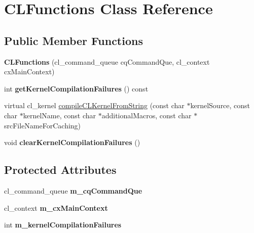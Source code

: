\hypertarget{class_c_l_functions}{\section{C\+L\+Functions Class Reference}
\label{class_c_l_functions}
}
\subsection*{Public Member Functions}
\begin{DoxyCompactItemize}
\item 
\hypertarget{class_c_l_functions_a1aba8fcfae73b1cf3992be273c649cb1}{{\bfseries C\+L\+Functions} (cl\+\_\+command\+\_\+queue cq\+Command\+Que, cl\+\_\+context cx\+Main\+Context)}\label{class_c_l_functions_a1aba8fcfae73b1cf3992be273c649cb1}

\item 
\hypertarget{class_c_l_functions_a0e188a86eb1fc902635a12a9364c4e18}{int {\bfseries get\+Kernel\+Compilation\+Failures} () const }\label{class_c_l_functions_a0e188a86eb1fc902635a12a9364c4e18}

\item 
virtual cl\+\_\+kernel \hyperlink{class_c_l_functions_a87f7cc3be08f51966e0bc087e7520a9f}{compile\+C\+L\+Kernel\+From\+String} (const char $\ast$kernel\+Source, const char $\ast$kernel\+Name, const char $\ast$additional\+Macros, const char $\ast$src\+File\+Name\+For\+Caching)
\item 
\hypertarget{class_c_l_functions_ae500f8c768182c5a432f4c506917eaad}{void {\bfseries clear\+Kernel\+Compilation\+Failures} ()}\label{class_c_l_functions_ae500f8c768182c5a432f4c506917eaad}

\end{DoxyCompactItemize}
\subsection*{Protected Attributes}
\begin{DoxyCompactItemize}
\item 
\hypertarget{class_c_l_functions_a0c1f36d128cf3cd2a7a66e8b7d08ef20}{cl\+\_\+command\+\_\+queue {\bfseries m\+\_\+cq\+Command\+Que}}\label{class_c_l_functions_a0c1f36d128cf3cd2a7a66e8b7d08ef20}

\item 
\hypertarget{class_c_l_functions_a5d82d7f0672c561bc8d0f24200d7683c}{cl\+\_\+context {\bfseries m\+\_\+cx\+Main\+Context}}\label{class_c_l_functions_a5d82d7f0672c561bc8d0f24200d7683c}

\item 
\hypertarget{class_c_l_functions_a9d3ea5032011c2cd587820b4600e54e9}{int {\bfseries m\+\_\+kernel\+Compilation\+Failures}}\label{class_c_l_functions_a9d3ea5032011c2cd587820b4600e54e9}

\end{DoxyCompactItemize}


